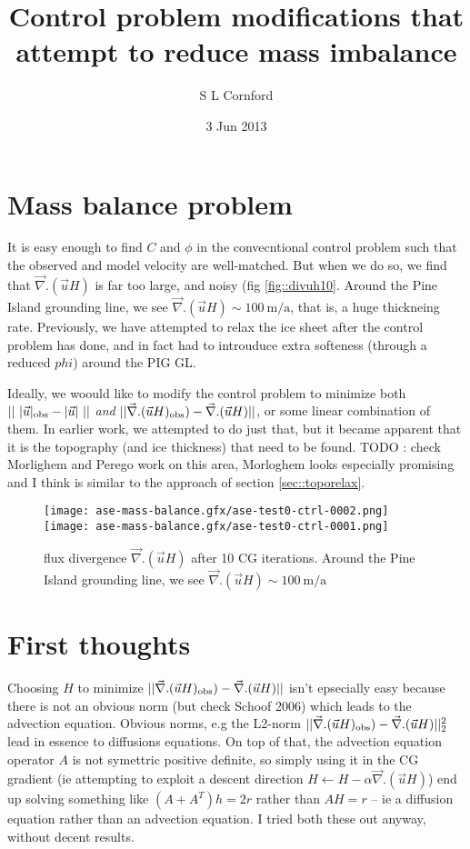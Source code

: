 \documentclass{article}
\title{Control problem modifications that attempt to reduce mass imbalance}
\author{S L Cornford}
\date{3 Jun 2013}\newcommand{\usrf}{s}
\begin{document}
\pagestyle{plain}
\maketitle
\tableofcontents

\section{Mass balance problem}

It is easy enough to find $C$ and $\phi$ in the convecntional control problem such that the
observed and model velocity are well-matched. But when we do so, we find that $\vec{\nabla}. (\vec{u} H)$
is far too large, and noisy (fig \ref{fig::divuh10}. Around the Pine Island grounding line, we see $\vec{\nabla}. (\vec{u} H) \sim 100~\mbox{m/a}$,
that is, a huge thickneing rate. Previously, we have attempted to relax the ice sheet after the control problem has done, and in fact had to
introuduce extra softeness (through a reduced $phi$) around the PIG GL.  

Ideally, we woould like to modify the control problem to minimize both $||~|\vec{u}|_{\rm obs} - |\vec{u}|~||$ 
\emph{and} $||\vec{\nabla}. (\vec{u} H)_{\rm obs}) - \vec{\nabla}. (\vec{u} H)  ||$, or some linear combination
of them. In earlier work, we attempted to do just that, but it became apparent that it is the topography 
(and ice thickness) that need to be found. TODO : check Morlighem and Perego work on this area, Morloghem 
looks especially promising and I think is similar to the approach of section \ref{sec::toporelax}.

\begin{figure}
\begin{center}
\texttt{[image: ase-mass-balance.gfx/ase-test0-ctrl-0002.png]}
\texttt{[image: ase-mass-balance.gfx/ase-test0-ctrl-0001.png]}
\end{center}
\caption{\protect{\label{fig::divuh10}}} flux divergence $\vec{\nabla}. (\vec{u} H)$
after 10 CG iterations. Around the Pine Island grounding line, we see $\vec{\nabla}. (\vec{u} H) \sim 100~\mbox{m/a}$
\end{figure}

\section{First thoughts}

Choosing $H$ to minimize  $||\vec{\nabla}. (\vec{u} H)_{\rm obs}) - \vec{\nabla}. (\vec{u} H)  ||$ isn't
epsecially easy because there is not an obvious norm (but check Schoof 2006) which leads to the
advection equation. Obvious norms, e.g the L2-norm $||\vec{\nabla}. (\vec{u} H)_{\rm obs}) - \vec{\nabla}. (\vec{u} H)  ||^2_2$ lead 
in essence to diffusions equations. On top of that, the advection equation operator $A$ is not symettric positive definite,
so simply using it in the CG gradient (ie attempting to exploit a descent direction $H \leftarrow H - \alpha  \vec{\nabla}. (\vec{u} H)$)
end up solving something like $ (A + A^T)h = 2 r$ rather than $ A H = r$ -- ie a diffusion equation rather than an advection equation.
I tried both these out anyway, without decent results.
\end{document}
